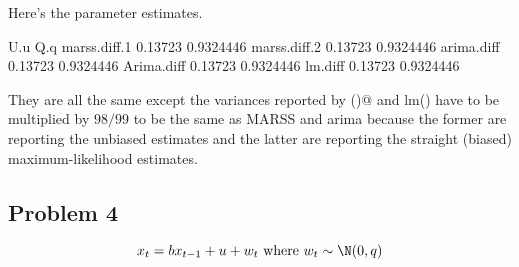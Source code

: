 \begin{wideenumerate}
Here's the parameter estimates. 
\begin{Schunk}
\begin{Soutput}
                 U.u       Q.q
marss.diff.1 0.13723 0.9324446
marss.diff.2 0.13723 0.9324446
arima.diff   0.13723 0.9324446
Arima.diff   0.13723 0.9324446
lm.diff      0.13723 0.9324446
\end{Soutput}
\end{Schunk}
They are all the same except the variances reported by \verb@Arima()@ and lm() have to be multiplied by $98/99$ to be the same as MARSS and arima because the former are reporting the unbiased estimates and the latter are reporting the straight (biased) maximum-likelihood estimates.

\end{wideenumerate}

\subsection*{Problem 4}

\begin{equation}
x_t = b x_{t-1}+u+w_t \text{ where } w_t \sim \N(0,q)  
\label{eq:gompertz}\end{equation}

